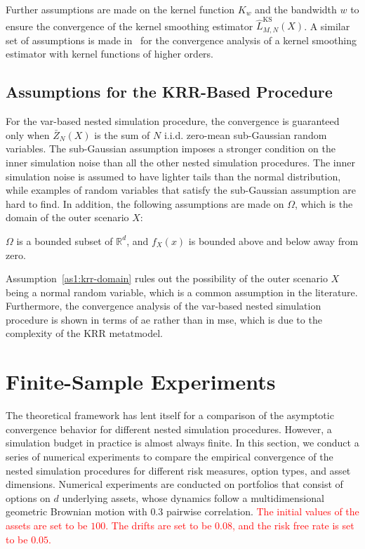 Further assumptions are made on the kernel function $K_w$ and the bandwidth $w$ to ensure the convergence of the kernel smoothing estimator $\hat{L}^{\text{KS}}_{M, N}(X)$.
A similar set of assumptions is made in~\cite{jennen1988unifying} for the convergence analysis of a kernel smoothing estimator with kernel functions of higher orders.

\subsection{Assumptions for the KRR-Based Procedure}
For the \gls{var}-based nested simulation procedure, the convergence is guaranteed only when $\bar{Z}_N(X)$ is the sum of $N$ i.i.d. zero-mean sub-Gaussian random variables.
The sub-Gaussian assumption imposes a stronger condition on the inner simulation noise than all the other nested simulation procedures.
The inner simulation noise is assumed to have lighter tails than the normal distribution, while examples of random variables that satisfy the sub-Gaussian assumption are hard to find.
In addition, the following assumptions are made on $\Omega$, which is the domain of the outer scenario $X$:

\begin{assumption}\label{as1:krr-domain}
    $\Omega$ is a bounded subset of $\mathbb{R}^d$, and $f_X(x)$ is bounded above and below away from zero.
\end{assumption}

Assumption~\ref{as1:krr-domain} rules out the possibility of the outer scenario $X$ being a normal random variable, which is a common assumption in the literature.
Furthermore, the convergence analysis of the \gls{var}-based nested simulation procedure is shown in terms of \gls{ae} rather than in \gls{mse}, which is due to the complexity of the KRR metatmodel.

\section{Finite-Sample Experiments}\label{sec1:numerical-experiments}
The theoretical framework has lent itself for a comparison of the asymptotic convergence behavior for different nested simulation procedures.
However, a simulation budget in practice is almost always finite.
In this section, we conduct a series of numerical experiments to compare the empirical convergence of the nested simulation procedures for different risk measures, option types, and asset dimensions.
Numerical experiments are conducted on portfolios that consist of options on $d$ underlying assets, whose dynamics follow a multidimensional geometric Brownian motion with $0.3$ pairwise correlation.
\textcolor{red}{The initial values of the assets are set to be $100$.}
\textcolor{red}{The drifts are set to be $0.08$, and the risk free rate is set to be $0.05$.}

